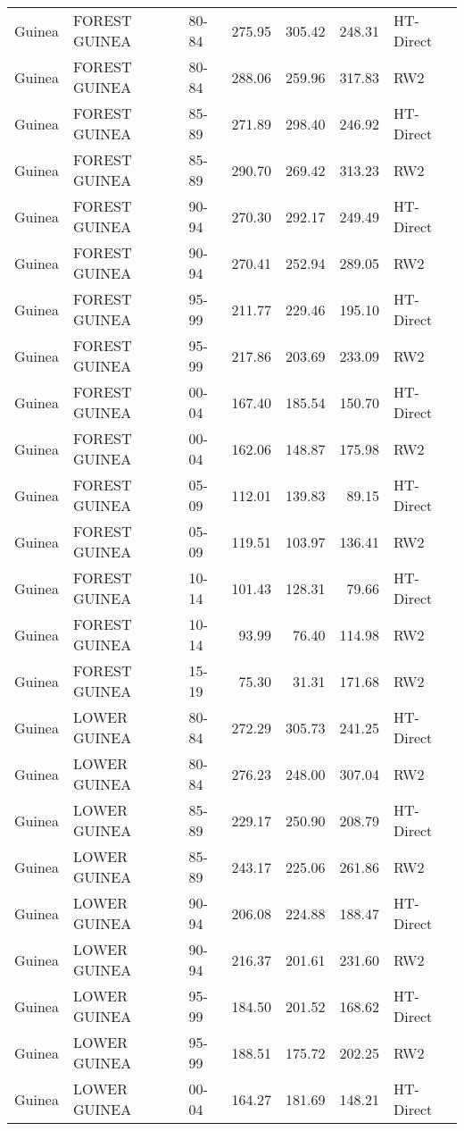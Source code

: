 \begin{longtable}{lllrrrl}
  Guinea & FOREST GUINEA & 80-84 & 275.95 & 305.42 & 248.31 & HT-Direct \\ 
  Guinea & FOREST GUINEA & 80-84 & 288.06 & 259.96 & 317.83 & RW2 \\ 
  Guinea & FOREST GUINEA & 85-89 & 271.89 & 298.40 & 246.92 & HT-Direct \\ 
  Guinea & FOREST GUINEA & 85-89 & 290.70 & 269.42 & 313.23 & RW2 \\ 
  Guinea & FOREST GUINEA & 90-94 & 270.30 & 292.17 & 249.49 & HT-Direct \\ 
  Guinea & FOREST GUINEA & 90-94 & 270.41 & 252.94 & 289.05 & RW2 \\ 
  Guinea & FOREST GUINEA & 95-99 & 211.77 & 229.46 & 195.10 & HT-Direct \\ 
  Guinea & FOREST GUINEA & 95-99 & 217.86 & 203.69 & 233.09 & RW2 \\ 
  Guinea & FOREST GUINEA & 00-04 & 167.40 & 185.54 & 150.70 & HT-Direct \\ 
  Guinea & FOREST GUINEA & 00-04 & 162.06 & 148.87 & 175.98 & RW2 \\ 
  Guinea & FOREST GUINEA & 05-09 & 112.01 & 139.83 & 89.15 & HT-Direct \\ 
  Guinea & FOREST GUINEA & 05-09 & 119.51 & 103.97 & 136.41 & RW2 \\ 
  Guinea & FOREST GUINEA & 10-14 & 101.43 & 128.31 & 79.66 & HT-Direct \\ 
  Guinea & FOREST GUINEA & 10-14 & 93.99 & 76.40 & 114.98 & RW2 \\ 
  Guinea & FOREST GUINEA & 15-19 & 75.30 & 31.31 & 171.68 & RW2 \\ 
  Guinea & LOWER GUINEA & 80-84 & 272.29 & 305.73 & 241.25 & HT-Direct \\ 
  Guinea & LOWER GUINEA & 80-84 & 276.23 & 248.00 & 307.04 & RW2 \\ 
  Guinea & LOWER GUINEA & 85-89 & 229.17 & 250.90 & 208.79 & HT-Direct \\ 
  Guinea & LOWER GUINEA & 85-89 & 243.17 & 225.06 & 261.86 & RW2 \\ 
  Guinea & LOWER GUINEA & 90-94 & 206.08 & 224.88 & 188.47 & HT-Direct \\ 
  Guinea & LOWER GUINEA & 90-94 & 216.37 & 201.61 & 231.60 & RW2 \\ 
  Guinea & LOWER GUINEA & 95-99 & 184.50 & 201.52 & 168.62 & HT-Direct \\ 
  Guinea & LOWER GUINEA & 95-99 & 188.51 & 175.72 & 202.25 & RW2 \\ 
  Guinea & LOWER GUINEA & 00-04 & 164.27 & 181.69 & 148.21 & HT-Direct \\ 

\end{longtable}

